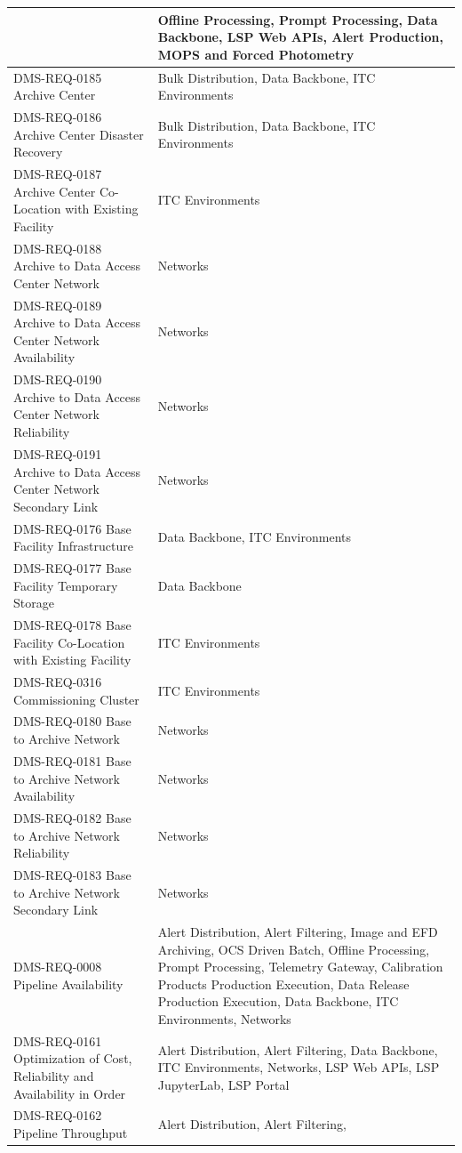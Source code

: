 \documentclass[DM,lsstdraft,toc]{lsstdoc}
\begin{document}
\begin{xtabular}{|p{0.4\textwidth}|p{0.55\textwidth}|}
& Offline Processing, Prompt Processing, Data Backbone, LSP Web APIs,
Alert Production, MOPS and Forced Photometry\\ \hline
DMS-REQ-0185 Archive Center & Bulk Distribution, Data Backbone, ITC
Environments\\ \hline
DMS-REQ-0186 Archive Center Disaster Recovery & Bulk Distribution, Data
Backbone, ITC Environments\\ \hline
DMS-REQ-0187 Archive Center Co-Location with Existing Facility & ITC
Environments\\ \hline
DMS-REQ-0188 Archive to Data Access Center Network &
Networks\\ \hline
DMS-REQ-0189 Archive to Data Access Center Network Availability &
Networks\\ \hline
DMS-REQ-0190 Archive to Data Access Center Network Reliability &
Networks\\ \hline
DMS-REQ-0191 Archive to Data Access Center Network Secondary Link &
Networks\\ \hline
DMS-REQ-0176 Base Facility Infrastructure & Data Backbone, ITC
Environments\\ \hline
DMS-REQ-0177 Base Facility Temporary Storage & Data
Backbone\\ \hline
DMS-REQ-0178 Base Facility Co-Location with Existing Facility & ITC
Environments\\ \hline
DMS-REQ-0316 Commissioning Cluster & ITC Environments\\ \hline
DMS-REQ-0180 Base to Archive Network & Networks\\ \hline
DMS-REQ-0181 Base to Archive Network Availability &
Networks\\ \hline
DMS-REQ-0182 Base to Archive Network Reliability &
Networks\\ \hline
DMS-REQ-0183 Base to Archive Network Secondary Link &
Networks\\ \hline
DMS-REQ-0008 Pipeline Availability & Alert Distribution, Alert
Filtering, Image and EFD Archiving, OCS Driven Batch, Offline
Processing, Prompt Processing, Telemetry Gateway, Calibration Products
Production Execution, Data Release Production Execution, Data Backbone,
ITC Environments, Networks\\ \hline
DMS-REQ-0161 Optimization of Cost, Reliability and Availability in Order
& Alert Distribution, Alert Filtering, Data Backbone, ITC Environments,
Networks, LSP Web APIs, LSP JupyterLab, LSP Portal\\ \hline
DMS-REQ-0162 Pipeline Throughput & Alert Distribution, Alert Filtering,

\end{xtabular}
\end{document}

